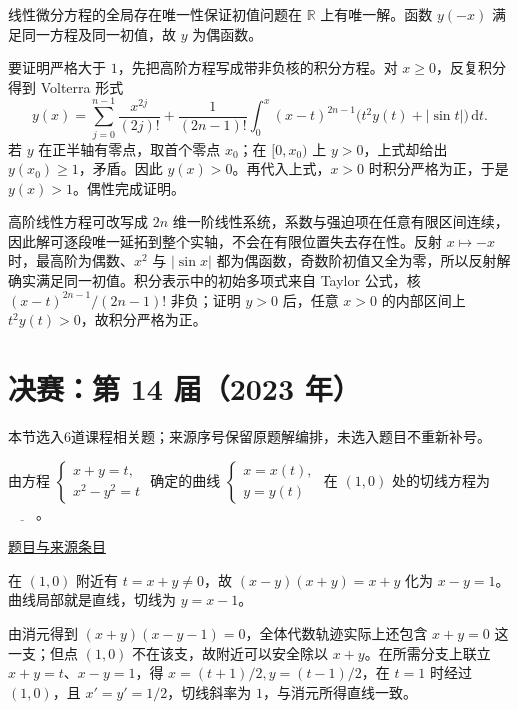 \documentclass[UTF8,12pt,a4paper,fontset=fandol]{ctexart}
\begin{document}
\begin{solve}\label{ans:fin13-low:10}

线性微分方程的全局存在唯一性保证初值问题在 $\mathbb R$ 上有唯一解。函数 $y(-x)$ 满足同一方程及同一初值，故 $y$ 为偶函数。

要证明严格大于 $1$，先把高阶方程写成带非负核的积分方程。对 $x\ge0$，反复积分得到 Volterra 形式
\[
y(x)=\sum_{j=0}^{n-1}\frac{x^{2j}}{(2j)!}
+\frac1{(2n-1)!}\int_0^x(x-t)^{2n-1}\bigl(t^2y(t)+|\sin t|\bigr)\,\mathrm dt.
\]
若 $y$ 在正半轴有零点，取首个零点 $x_0$；在 $[0,x_0)$ 上 $y>0$，上式却给出 $y(x_0)\ge1$，矛盾。因此 $y(x)>0$。再代入上式，$x>0$ 时积分严格为正，于是 $y(x)>1$。偶性完成证明。

高阶线性方程可改写成 $2n$ 维一阶线性系统，系数与强迫项在任意有限区间连续，因此解可逐段唯一延拓到整个实轴，不会在有限位置失去存在性。反射 $x\mapsto-x$ 时，最高阶为偶数、$x^2$ 与 $|\sin x|$ 都为偶函数，奇数阶初值又全为零，所以反射解确实满足同一初值。积分表示中的初始多项式来自 Taylor 公式，核 $(x-t)^{2n-1}/(2n-1)!$ 非负；证明 $y>0$ 后，任意 $x>0$ 的内部区间上 $t^2y(t)>0$，故积分严格为正。

\end{solve}

\section{决赛：第 14 届（2023 年）}

本节选入6道课程相关题；来源序号保留原题解编排，未选入题目不重新补号。

\begin{example}[来源序号1]\label{ex:fin14-high:1}\label{pr:fin14-high:1}

由方程 $\begin{cases} x+y=t, \\ x^2-y^2=t \end{cases}$ 确定的曲线 $\begin{cases} x=x(t), \\ y=y(t) \end{cases}$ 在 $(1,0)$ 处的切线方程为$\underline{\qquad}$。

\par\href{https://github.com/lzxcr/cmc-mathematics/blob/64916fa1fdbc3e444a652eca204d5669058ee321/src/problems/finals/14/01.md}{题目与来源条目}

\end{example}

\begin{solve}\label{ans:fin14-high:1}

在 $(1,0)$ 附近有 $t=x+y\ne0$，故 $(x-y)(x+y)=x+y$ 化为 $x-y=1$。曲线局部就是直线，切线为 $\boxed{y=x-1}$。

由消元得到 $(x+y)(x-y-1)=0$，全体代数轨迹实际上还包含 $x+y=0$ 这一支；但点 $(1,0)$ 不在该支，故附近可以安全除以 $x+y$。在所需分支上联立 $x+y=t$、$x-y=1$，得 $x=(t+1)/2,y=(t-1)/2$，在 $t=1$ 时经过 $(1,0)$，且 $x'=y'=1/2$，切线斜率为 $1$，与消元所得直线一致。

\end{solve}
\end{document}
